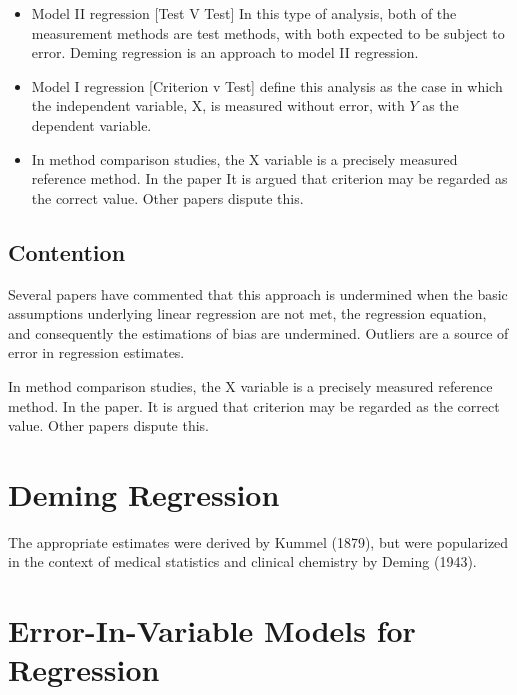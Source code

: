 \documentclass[12pt, a4paper]{report}
\theoremstyle{plain}
\theoremstyle{definition}
\theoremstyle{remark}
\begin{document}
\begin{itemize}
	\item Model II regression [Test V Test] In this type of analysis, both of the measurement methods are test methods, with both expected to be subject to error. Deming regression is an approach to model II regression.
	
	\item Model I regression [Criterion v Test] \citet{CornCoch} define this analysis as the case in which the independent variable, X, is measured without error, with $Y$ as the dependent
	variable.
	
	\item In method comparison studies, the X variable is a precisely measured reference method. In the \citet{CornCoch} paper It is argued that criterion may be regarded as the correct value.
	Other papers dispute this.
\end{itemize}


\subsection{Contention }
Several papers have commented that this approach is undermined
when the basic assumptions underlying linear regression are not
met, the regression equation, and consequently the estimations of
bias are undermined. Outliers are a source of error in regression
estimates.


In method comparison studies, the X variable is a precisely measured reference method. In the \citet{CornCoch} paper. It is argued that criterion may be regarded as the correct value. Other papers dispute this.






\section{Deming Regression}
The appropriate estimates were derived by Kummel (1879), but were popularized in the context of medical statistics and clinical chemistry by Deming (1943).






\section{Error-In-Variable Models for Regression}
\end{document}
